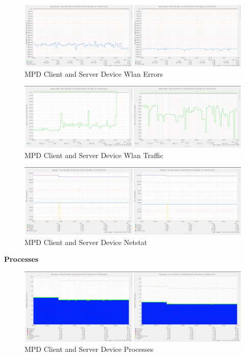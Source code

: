 \documentclass[11pt,a4paper,headinclude=false,footinclude=false]{scrreprt}
\begin{document}
\begin{figure}[H]
\includegraphics{ResultsAndAnalysis/MPDServerTestImages/020MPDWlan0Errors.png}
\centering
\caption{MPD Client and Server Device Wlan Errors}
\label{MPDWlanError}
\end{figure}

\begin{figure}[H]
\includegraphics{ResultsAndAnalysis/MPDServerTestImages/021MPDWlan0Traffic.png}
\centering
\caption{MPD Client and Server Device Wlan Traffic}
\label{MPDWlanTraffic}
\end{figure}

\begin{figure}[H]
\includegraphics{ResultsAndAnalysis/MPDServerTestImages/017MPDNetstat.png}
\centering
\caption{MPD Client and Server Device Netstat}
\label{MPDNetstat}
\end{figure}

\textbf{Processes}

\begin{figure}[H]
\includegraphics{ResultsAndAnalysis/MPDServerTestImages/019MPDProcesses.png}
\centering
\caption{MPD Client and Server Device Processes}
\label{MPDProcesses}
\end{figure}
\end{document}
